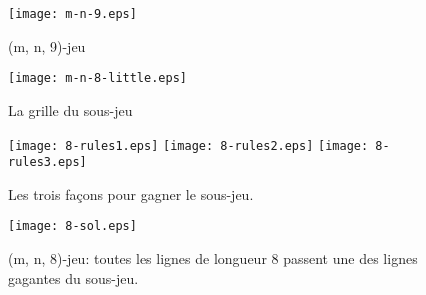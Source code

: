 \documentclass{beamer}
\begin{document}
\begin{figure}[h]
    \centering
    \texttt{[image: m-n-9.eps]}
    \caption{(m, n, 9)-jeu}
    \label{fig:m-n-9}
\end{figure}

\begin{figure}[h]
    \centering
    \texttt{[image: m-n-8-little.eps]}
    \caption{La grille du sous-jeu}
    \label{fig:sous-jeu}
\end{figure}

\begin{figure}[h]
    \centering
    \texttt{[image: 8-rules1.eps]}
    \texttt{[image: 8-rules2.eps]}
    \texttt{[image: 8-rules3.eps]}
    \caption{Les trois façons pour gagner le sous-jeu.}
    \label{fig:regle}
\end{figure}

\begin{figure}[h]
    \centering
    \texttt{[image: 8-sol.eps]}
    \caption{(m, n, 8)-jeu:
    toutes les lignes de longueur 8 passent une des lignes gagantes du sous-jeu.}
    \label{fig:m-n-8}
\end{figure}
\end{document}
